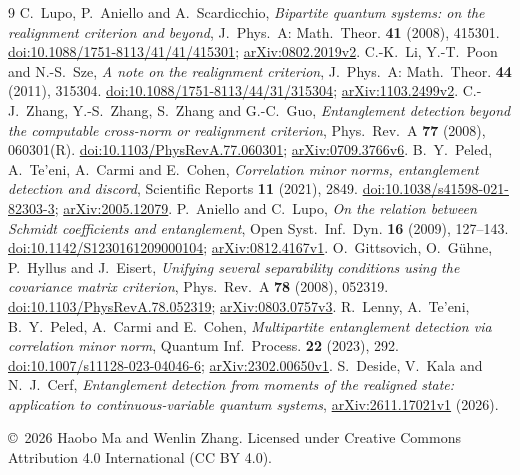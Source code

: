 \documentclass[11pt]{article}
\begin{document}
\begin{thebibliography}{9}
 C.~Lupo, P.~Aniello and A.~Scardicchio,
\emph{Bipartite quantum systems: on the realignment criterion and beyond},
J.~Phys.~A: Math.~Theor. \textbf{41} (2008), 415301.
\href{https://doi.org/10.1088/1751-8113/41/41/415301}{doi:10.1088/1751-8113/41/41/415301};
\href{https://arxiv.org/abs/0802.2019v2}{arXiv:0802.2019v2}.
 C.-K.~Li, Y.-T.~Poon and N.-S.~Sze,
\emph{A note on the realignment criterion},
J.~Phys.~A: Math.~Theor. \textbf{44} (2011), 315304.
\href{https://doi.org/10.1088/1751-8113/44/31/315304}{doi:10.1088/1751-8113/44/31/315304};
\href{https://arxiv.org/abs/1103.2499v2}{arXiv:1103.2499v2}.
 C.-J.~Zhang, Y.-S.~Zhang, S.~Zhang and G.-C.~Guo,
\emph{Entanglement detection beyond the computable cross-norm or
realignment criterion}, Phys.~Rev.~A \textbf{77} (2008), 060301(R).
\href{https://doi.org/10.1103/PhysRevA.77.060301}{doi:10.1103/PhysRevA.77.060301};
\href{https://arxiv.org/abs/0709.3766v6}{arXiv:0709.3766v6}.
 B.~Y.~Peled, A.~Te'eni, A.~Carmi and E.~Cohen,
\emph{Correlation minor norms, entanglement detection and discord},
Scientific Reports \textbf{11} (2021), 2849.
\href{https://doi.org/10.1038/s41598-021-82303-3}{doi:10.1038/s41598-021-82303-3};
\href{https://arxiv.org/abs/2005.12079}{arXiv:2005.12079}.
 P.~Aniello and C.~Lupo,
\emph{On the relation between Schmidt coefficients and entanglement},
Open Syst.~Inf.~Dyn. \textbf{16} (2009), 127--143.
\href{https://doi.org/10.1142/S1230161209000104}{doi:10.1142/S1230161209000104};
\href{https://arxiv.org/abs/0812.4167v1}{arXiv:0812.4167v1}.
 O.~Gittsovich, O.~G\"uhne, P.~Hyllus and J.~Eisert,
\emph{Unifying several separability conditions using the covariance
matrix criterion}, Phys.~Rev.~A \textbf{78} (2008), 052319.
\href{https://doi.org/10.1103/PhysRevA.78.052319}{doi:10.1103/PhysRevA.78.052319};
\href{https://arxiv.org/abs/0803.0757v3}{arXiv:0803.0757v3}.
 R.~Lenny, A.~Te'eni, B.~Y.~Peled, A.~Carmi and E.~Cohen,
\emph{Multipartite entanglement detection via correlation minor norm},
Quantum Inf.~Process. \textbf{22} (2023), 292.
\href{https://doi.org/10.1007/s11128-023-04046-6}{doi:10.1007/s11128-023-04046-6};
\href{https://arxiv.org/abs/2302.00650v1}{arXiv:2302.00650v1}.
 S.~Deside, V.~Kala and N.~J.~Cerf,
\emph{Entanglement detection from moments of the realigned state:
application to continuous-variable quantum systems},
\href{https://arxiv.org/abs/2611.17021v1}{arXiv:2611.17021v1} (2026).
\end{thebibliography}
\medskip\noindent\small
\copyright\ 2026 Haobo Ma and Wenlin Zhang.
Licensed under Creative Commons Attribution 4.0 International (CC BY 4.0).
\end{document}
